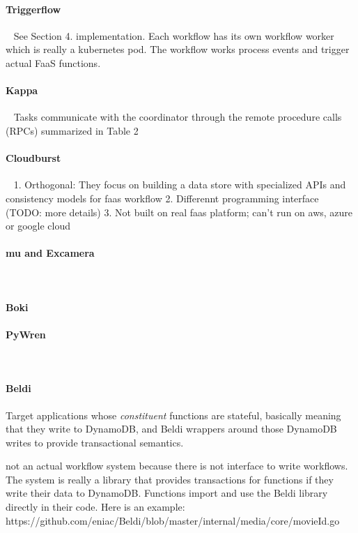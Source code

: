 \paragraph{Triggerflow}~\cite{triggerflow}
See Section 4. implementation. Each workflow has its own workflow worker which is really a kubernetes pod. The workflow works process events and trigger actual FaaS functions.


\paragraph{Kappa}~\cite{kappa}
Tasks communicate with the coordinator through
the remote procedure calls (RPCs) summarized in Table 2


\paragraph{Cloudburst}~\cite{cloudburst}
1. Orthogonal: They focus on building a data store with specialized APIs and consistency models for faas workflow
2. Differennt programming interface (TODO: more details)
3. Not built on real faas platform; can't run on aws, azure or google cloud


\paragraph{mu and Excamera}~\cite{excamera}

\paragraph{Boki}


\paragraph{PyWren}~\cite{pywren}

\paragraph{Beldi}

Target applications whose \emph{constituent} functions are stateful, basically meaning that they write to DynamoDB, and Beldi wrappers around those DynamoDB writes to provide transactional semantics.

not an actual workflow system because there is not interface to write
workflows. The system is really a library that provides transactions for
functions if they write their data to DynamoDB. Functions import and use the
Beldi library directly in their code. Here is an example:
https://github.com/eniac/Beldi/blob/master/internal/media/core/movieId.go

